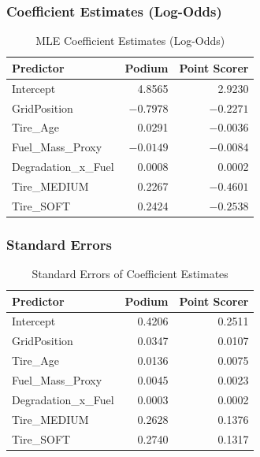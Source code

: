 \subsubsection{Coefficient Estimates (Log-Odds)}

\begin{table}[htbp]
  \centering
  \caption{MLE Coefficient Estimates (Log-Odds)}
  \label{tab:coefficients}
  \small
  \begin{tabular}{lrr}
    \toprule
    \textbf{Predictor} & \textbf{Podium} & \textbf{Point Scorer} \\
    \midrule
    Intercept           &  4.8565  &  2.9230 \\
    GridPosition        & $-0.7978$ & $-0.2271$ \\
    Tire\_Age           &  0.0291  & $-0.0036$ \\
    Fuel\_Mass\_Proxy   & $-0.0149$ & $-0.0084$ \\
    Degradation\_x\_Fuel &  0.0008  &  0.0002 \\
    Tire\_MEDIUM        &  0.2267  & $-0.4601$ \\
    Tire\_SOFT          &  0.2424  & $-0.2538$ \\
    \bottomrule
  \end{tabular}
\end{table}

\subsubsection{Standard Errors}

\begin{table}[htbp]
  \centering
  \caption{Standard Errors of Coefficient Estimates}
  \label{tab:std-errors}
  \small
  \begin{tabular}{lrr}
    \toprule
    \textbf{Predictor} & \textbf{Podium} & \textbf{Point Scorer} \\
    \midrule
    Intercept           & 0.4206  & 0.2511 \\
    GridPosition        & 0.0347  & 0.0107 \\
    Tire\_Age           & 0.0136  & 0.0075 \\
    Fuel\_Mass\_Proxy   & 0.0045  & 0.0023 \\
    Degradation\_x\_Fuel & 0.0003  & 0.0002 \\
    Tire\_MEDIUM        & 0.2628  & 0.1376 \\
    Tire\_SOFT          & 0.2740  & 0.1317 \\
    \bottomrule
  \end{tabular}
\end{table}

